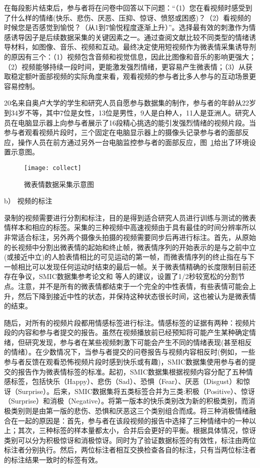 在每段影片结束后，参与者将在问卷中回答以下问题：“（1）您在看视频时感受到了什么样的情绪(快乐、悲伤、厌恶、压抑、惊讶、愤怒或困惑)？（2）看视频的时候您是否感觉到愉悦？（从1到7愉悦程度逐渐上升）”。选择最有效的刺激作为情感诱导因子是后续数据采集的关键因素之一。通过查阅文献比较不同类型的情绪诱导材料，如图像、音乐、视频和互动。最终决定使用短视频作为微表情采集诱导剂的原因有三个：（1）视频包含音频和视觉信息，因此比图像和音乐的影响更强大；（2）视频能够持续一段时间，更能激发强烈情绪，更容易产生微表情；（3）从获取稳定额叶面部视频的实际角度来看，观看视频的参与者比多人参与的互动场景更容易控制。

20名来自奥卢大学的学生和研究人员自愿参与数据集的制作，参与者的年龄从22岁到34岁不等，其中7位是女性，13位是男性，9人是白种人，11人是亚洲人。研究人员在电脑显示器上向参与者展示了16段精心挑选的能引发强烈情绪的视频片段。当参与者观看视频片段时，三个固定在电脑显示器上的摄像头记录参与者的面部反应，操作人员在前方通过另外一台电脑监控参与者的面部反应，图~\ref{fig3}给出了环境设置示意图。

\begin{figure}[!htbp]
    \centering
    \texttt{[image: collect]}
    \caption{微表情数据采集示意图}
    \label{fig3}
\end{figure}

b） 视频的标注

录制的视频需要进行分割和标注，目的是得到适合研究人员进行训练与测试的微表情样本和相应的标签。采集的三种视频中高速视频由于具有最佳的时间分辨率所以非常适合标注，另外两个摄像头拍摄的视频需要同步后再进行标注。首先，从原始的长视频中分割出微表情的起始和终止帧，微表情序列的开始表示的是与之前中立(或接近中立)的人脸表情相比的可见运动的第一帧，而微表情序列的终止指在与下一帧相比可以发现任何运动时结束的最后一帧。关于微表情精确的长度限制目前还存在争议，SMIC数据集参考论文和 等人的建议，设置了1/2秒较宽松的分割节点。注意，并不是所有的微表情都结束于一个完全的中性表情，有些表情可能会上升，然后下降到接近中性的状态，并保持这种状态很长时间，这也被认为是微表情的结束。

随后，对所有的视频片段都用情感标签进行标注。情感标签的证据有两种：视频片段的内容和参与者提交的报告。虽然在视频播放前已经预知将可能产生某种确定情绪，但研究发现，参与者在某些视频刺激下可能会产生不同的情绪表现(甚至相反的情绪）。在少数情况下，当参与者提交的问卷报告与视频内容相反时(例如，一些参与者反馈在观看恐怖视频片段时感到快乐或有趣)，SMIC数据集使用参与者的提交的报告作为微表情标签的标准。起初，SMIC数据集根据视频内容分配了五种情感标签，包括快乐（Happy）、悲伤（Sad）、恐惧（Fear）、厌恶（Disgust）和惊讶（Surprise）。后来，SMIC数据集将五类标签合并为三类:积极（Positive）、惊讶（Surprise）和消极（Negative）。将第一版本的快乐类别改为新的积极类别，而消极类别则是由第一版的悲伤、恐惧和厌恶这三个类别组合而成。将三种消极情绪融合在一起的原因是：首先，参与者在该段视频的报告中选择了三种情绪中的一种以上；其次，三种标签的样本量都太小，合并后会更好的平衡。根据具体情况，惊讶类别可以分为积极惊讶和消极惊讶。同时为了验证数据标签的有效性，标注由两位标注者分别执行。然后，两位标注者相互交换检查各自的标注，只有当两位标注者的标注结果一致时的标签有效。

